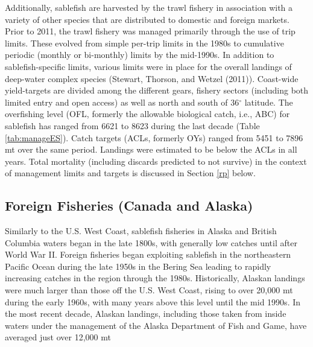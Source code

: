 \documentclass[11pt,
  english,
  a4paper,
]{article}
\begin{document}
\leavevmode\tagmcend\tagstructend\par


Additionally, sablefish are harvested by the trawl fishery in association with a variety of other species that are distributed to domestic and foreign markets. Prior to 2011, the trawl fishery was managed primarily through the use of trip limits. These evolved from simple per-trip limits in the 1980s to cumulative periodic (monthly or bi-monthly) limits by the mid-1990s. In addition to sablefish-specific limits, various limits were in place for the overall landings of deep-water complex species ({Stewart, Thorson, and Wetzel (2011)\leavevmode\tagmcend\tagstructend}). Coast-wide yield-targets are divided among the different gears, fishery sectors (including both limited entry and open access) as well as north and south of 36{\(^{\circ}\)\leavevmode\tagmcend\tagstructend} latitude. The overfishing level (OFL, formerly the allowable biological catch, i.e., ABC) for sablefish has ranged from 6621 to 8623 during the last decade (Table \ref{tab:manageES}). Catch targets (ACLs, formerly OYs) ranged from 5451 to 7896 mt over the same period. Landings were estimated to be below the ACLs in all years. Total mortality (including discards predicted to not survive) in the context of management limits and targets is discussed in Section \ref{rp} below.

\leavevmode\tagmcend\tagstructend\par


\hypertarget{foreign-fisheries-canada-and-alaska}{%
\subsection{Foreign Fisheries (Canada and Alaska)}\label{foreign-fisheries-canada-and-alaska}}

\leavevmode\tagmcend\tagstructend

Similarly to the U.S. West Coast, sablefish fisheries in Alaska and British Columbia waters began in the late 1800s, with generally low catches until after World War II. Foreign fisheries began exploiting sablefish in the northeastern Pacific Ocean during the late 1950s in the Bering Sea leading to rapidly increasing catches in the region through the 1980s. Historically, Alaskan landings were much larger than those off the U.S. West Coast, rising to over 20,000 mt during the early 1960s, with many years above this level until the mid 1990s. In the most recent decade, Alaskan landings, including those taken from inside waters under the management of the Alaska Department of Fish and Game, have averaged just over 12,000 mt
\end{document}

